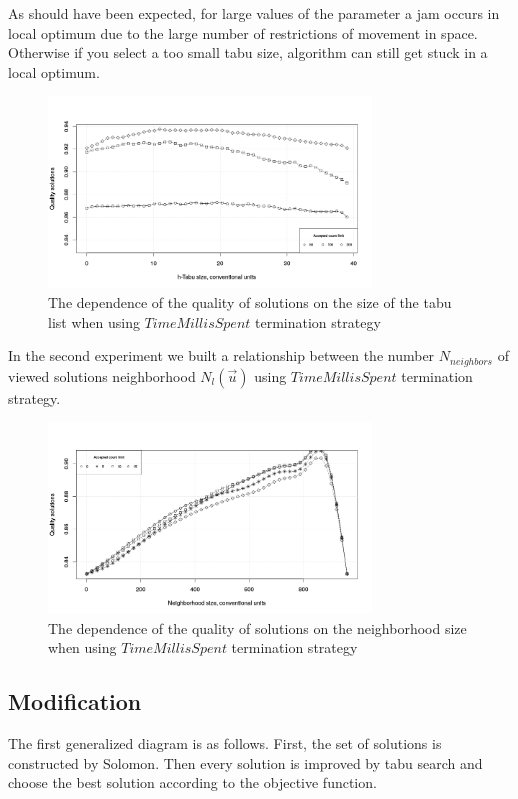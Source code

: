 \documentclass[]{TAACpaper}
\begin{document}
As should have been expected, for large values of the parameter a jam occurs in local optimum due to the large number of restrictions of movement in space. Otherwise if you select a too small tabu size, algorithm can still get stuck in a local optimum. 
\begin{figure}[h]
	\hfil\includegraphics[height=2.0in]{images/tabuSize_time}\hfil
	\caption
	{
	  The dependence of the quality of solutions on the size of the tabu list when using $ TimeMillisSpent $ termination strategy
	}
	\label{aba:fig1}
\end{figure}

In the second experiment we built a relationship between the number $N_{neighbors}$ of viewed solutions neighborhood $N_l(\vec{u})$ using $TimeMillisSpent$ termination strategy. 
\begin{figure}[h]
	\hfil\includegraphics[height=2.0in]{images/acceptedCountLimit}\hfil
	\caption
	{
	  The dependence of the quality of solutions on the neighborhood size when using $ TimeMillisSpent $ termination strategy
	}
	\label{aba:fig1}
\end{figure}


\subsection{Modification}

The first generalized diagram is as follows. First, the set of solutions is constructed by Solomon. Then every solution is improved by tabu search and choose the best solution according to the objective function.
\end{document}
